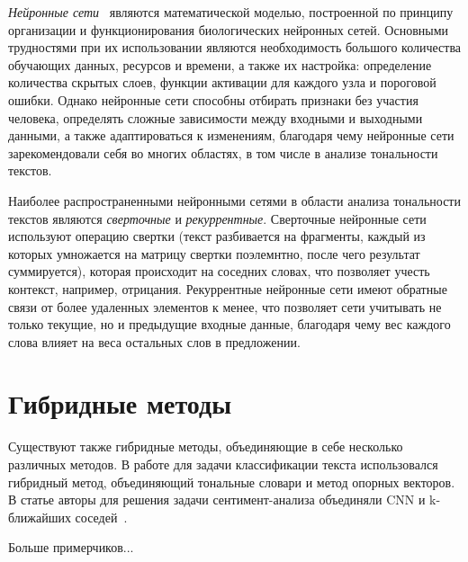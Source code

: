\textit{Нейронные сети}~\cite{article9} являются математической моделью,
построенной по принципу организации и функционирования биологических нейронных
сетей. Основными трудностями при их использовании являются необходимость
большого количества обучающих данных, ресурсов и времени, а также  их настройка:
определение количества скрытых слоев, функции активации для каждого узла и
пороговой ошибки. Однако нейронные сети способны отбирать признаки без участия
человека, определять сложные зависимости между входными и выходными данными, а
также адаптироваться к изменениям, благодаря чему нейронные сети зарекомендовали
себя во многих областях, в том числе в анализе тональности текстов.

Наиболее распространенными нейронными сетями в области анализа тональности
текстов являются \textit{сверточные} и \textit{рекуррентные}. Сверточные
нейронные сети используют операцию свертки (текст разбивается на фрагменты,
каждый из которых умножается на матрицу свертки поэлемнтно, после чего результат
суммируется), которая происходит на соседних словах, что позволяет учесть
контекст, например, отрицания. Рекуррентные нейронные сети имеют  обратные связи
от более удаленных элементов к менее, что позволяет сети учитывать не только
текущие, но и предыдущие входные данные, благодаря чему вес каждого слова влияет
на веса остальных слов в предложении.

\section{Гибридные методы}

Существуют также гибридные методы, объединяющие в себе несколько различных
методов.  В работе для задачи классификации текста использовался гибридный
метод, объединяющий тональные словари и метод опорных векторов.  В статье
авторы для решения задачи сентимент-анализа объединяли CNN и k-ближайших
соседей~\cite{article14}.

Больше примерчиков...


